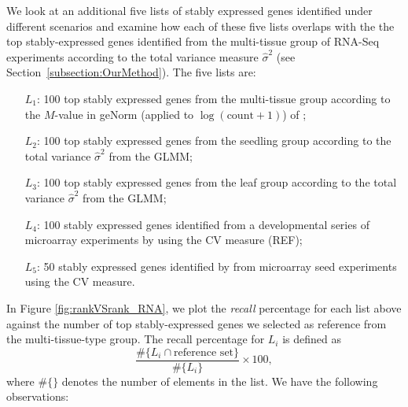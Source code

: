 \documentclass[11pt, a4paper]{article}
\begin{document}
We look at an additional five lists of stably expressed genes identified under
different scenarios and examine how each of these five lists overlaps with the
the top stably-expressed genes identified from the multi-tissue group  of
RNA-Seq experiments  according to the total variance measure $\hat\sigma^2$
(see Section~\ref{subsection:OurMethod}). 
The five lists are: 
\begin{enumerate}\label{list:L5}
    \item[$L_1$:]
 100 top stably expressed genes from the multi-tissue group according
 to the $M$-value in geNorm (applied to $\log(\text{count}+1)$) of \cite{vandesompele2002accurate} ; 
\item[$L_2$:]	
100 top stably expressed genes from the seedling group according to the total variance $\hat\sigma^2$ from the GLMM;
\item[$L_3$:]
100 top stably expressed genes from the leaf group according to the total variance $\hat\sigma^2$ from the GLMM; 
\item[$L_4$:]
100 stably expressed genes identified from a developmental series of microarray
experiments by \cite{czechowski2005genome} using the CV measure (REF); 
\item[$L_5$:] 50 stably expressed genes identified by \cite{dekkers2012identification} from microarray
seed experiments using the CV measure.  
\end{enumerate}
In Figure \ref{fig:rankVSrank_RNA}, we plot the {\em recall} percentage for
each list above against the number of top stably-expressed genes we selected
as reference from the multi-tissue-type group. 
The recall percentage for $L_i$ is defined as 
\[ \frac{ \#	 \{L_i \cap \text{reference set} \}}{\# \{L_i\}}\times 100, \]
where $\#\{ \}$ denotes the number of elements in the list.
We have the following observations:
\end{document}
